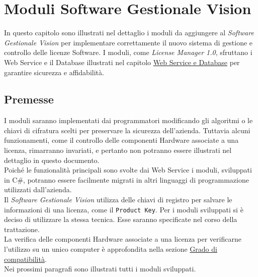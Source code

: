 
\chapter{Moduli Software Gestionale Vision}
\label{cap:moduli-vision}
In questo capitolo sono illustrati nel dettaglio i moduli da aggiungere al \textit{Software Gestionale Vision} per implementare correttamente il nuovo sistema di gestione e controllo delle licenze Software. I moduli, come \textit{License Manager 1.0}, sfruttano i Web Service e il Database illustrati nel capitolo {\hyperref[cap:sviluppo-software]{Web Service e Database}} per garantire sicurezza e affidabilità. 


\section{Premesse}
I moduli saranno implementati dai programmatori modificando gli algoritmi o le chiavi di cifratura scelti per preservare la sicurezza dell'azienda. Tuttavia alcuni funzionamenti, come il controllo delle componenti Hardware associate a una licenza, rimarranno invariati, e pertanto non potranno essere illustrati nel dettaglio in questo documento.
\\Poiché le funzionalità principali sono svolte dai Web Service i moduli, sviluppati in C\#, potranno essere facilmente migrati in altri linguaggi di programmazione utilizzati dall'azienda.
\\
Il \textit{Software Gestionale Vision} utilizza delle chiavi di registro per salvare le informazioni di una licenza, come il \texttt{Product Key}. Per i moduli sviluppati si è deciso di utilizzare la stessa tecnica. Esse saranno specificate nel corso della trattazione. 
\\La verifica delle componenti Hardware associate a una licenza per verificarne l'utilizzo su un unico computer è approfondita nella sezione {\hyperref[cap:appA]{Grado di compatibilità}}.  
\\Nei prossimi paragrafi sono illustrati tutti i moduli sviluppati.

\newpage
